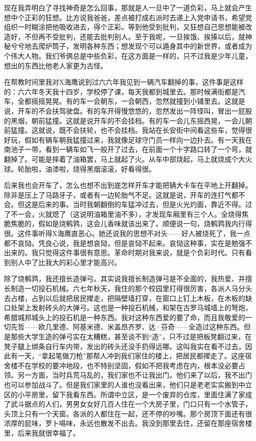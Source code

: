 现在我弄明白了寻找神奇是怎么回事，那就是人一旦中了一道负彩，马上就会产生想中个正彩的狂想。比方说我爸爸，差点被打成右派时去递上入党申请书，希望党组织一时糊涂把他吸收进去，得个正彩。等到他受到批判，又狂想自己思想能被改造好，不但再不受批判，还能去批判别人。至于我呢，一旦挨饿、挨揍以后，就神秘兮兮地去爬炉筒子，发明各种东西；想发现个可以遁身其中的新世界，或者成为个伟大人物。我们爷俩总是中些负彩，在这方面是一样的，只不过我是少年儿童，想出的东西比他老人家更为古怪。 

在帮教时间里我对X海鹰说到过六六年我见到一辆汽车翻掉的事，这件事是这样的：六六年冬天我十四岁，学校停了课，每天我都到城里去。那时候满街都是汽车，全都摇摇晃晃。有的车一会朝东，一会朝西，忽然就撞到小铺里去。这就是说，开车的不会扶驾驶盘。有的车开得慢悠悠的，忽然发出一阵怪叫，冒出一屁股的黑烟，朝前猛撞。这就是说开车的不会挂档。有的车一会儿东摇西晃，一会儿朝前猛撞。这就说，既不会扶轮，也不会挂档。我站在长安街中间看这些车，觉得很好玩，假如有辆车朝我猛撞过来，我就像足球守门员一样向一边扑去。有一天我在南池子一带，看到一辆车如飞一般开了过去，在前面一个十字路口转了一个弯，就翻掉了。可能是摔着了油箱罢，马上就起了火。从车中部烧起，马上就烧成个大火球。轮胎啦，油漆啦，烧得黑烟滚滚，好看得很。 

后来我也会开车了，怎么也想不出到底怎样开车才能把辆大卡车在平地上开翻掉。除非是压上了马路牙子，或者有一边轮胎气不足。这就是说，开车的连打气都不会。但这是后来的事。当时我朝翻倒的车猛冲过去，但是火光灼面，靠近不得。过了不一会，火就熄了（这说明油箱里油不多），才发现车厢里有三个人。全烧得焦脆焦脆的，假如是烧鹌鹑，这会儿香味就该出来了。顺便说一句，烧鹌鹑我内行得很。这件事听得X海鹰直恶心。她还说我的思想不对头——好人被烧死了，我一点都不哀恸。凭良心说，我是想哀恸，但是哀恸不起来。哀恸这种事，实在是勉强不出来的。我只觉得这件事很有意思。革命时期对我来说，就是个负彩时代。只有看到别人中了比我大的彩心里才能高兴。 

除了烧鹌鹑，我还擅长造弹弓。其实说我擅长制造弹弓是不全面的，我热爱、并擅长制造一切投石机械。六七年秋天，我住的那个校园里打得很厉害，各派人马分头去占楼，占到以后就把居民撵走，把隔壁墙打穿，在窗口上钉上木板，在木板的缺口处架上发射砖头的大弹弓。这也是一种投石机械，和架在古罗马城墙上的弩炮，希腊城邦城头上的投石机是一种东西。我对这种东西爱的要了命，而且我敬爱的一切先哲——欧几里德、阿基米德、米盖昂齐罗、达·芬奇——全造过这种东西。但是那些大学生造的弹弓实在太糟糕，甚至谈不到“造”，只不过是把板凳翻过来，在凳子腿上绑条自行车内带，发出的砖头还没手扔得远哪。这叫我实在看不过去，因此有一天，“拿起笔做刀枪”那帮人冲到我们家住的楼上，把居民都撵走了。这座宿舍楼不在学校的要冲地段，也不特别坚固，假如不把我考虑在内，根本没必要占领。另一方面，当时兵荒马乱的，我们家也不让我出门。他们来了以后，我不出门也可以参加战斗了。但是我们家里的人谁也没看出来，他们只是老老实实搬到中立区的小平房里，留下我看东西。所谓中立区，是一个废弃的仓库，里面住满了家成了武斗据点的人们，男男女女好几百人住在一个大房子里，门口只有一个水管子，头顶上只有一个天窗。各派的人都住在一起，还不停的吵嘴。那个房顶下面还有很浓厚的屁味，罗卜嗝味，永远也散发不出去。我没到那里去住，还留在那座宿舍楼里，后来我就很幸福了。 

